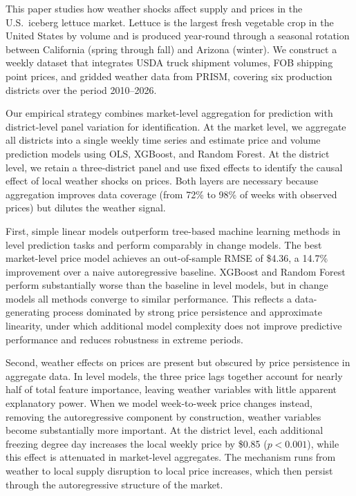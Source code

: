 \documentclass[12pt]{article}
\begin{document}
This paper studies how weather shocks affect supply and prices in the U.S.\ iceberg lettuce market. Lettuce is the largest fresh vegetable crop in the United States by volume and is produced year-round through a seasonal rotation between California (spring through fall) and Arizona (winter). We construct a weekly dataset that integrates USDA truck shipment volumes, FOB shipping point prices, and gridded weather data from PRISM, covering six production districts over the period 2010--2026.

Our empirical strategy combines market-level aggregation for prediction with district-level panel variation for identification. At the market level, we aggregate all districts into a single weekly time series and estimate price and volume prediction models using OLS, XGBoost, and Random Forest. At the district level, we retain a three-district panel and use fixed effects to identify the causal effect of local weather shocks on prices. Both layers are necessary because aggregation improves data coverage (from 72\% to 98\% of weeks with observed prices) but dilutes the weather signal.

First, simple linear models outperform tree-based machine learning methods in level prediction tasks and perform comparably in change models. The best market-level price model achieves an out-of-sample RMSE of \$4.36, a 14.7\% improvement over a naive autoregressive baseline. XGBoost and Random Forest perform substantially worse than the baseline in level models, but in change models all methods converge to similar performance. This reflects a data-generating process dominated by strong price persistence and approximate linearity, under which additional model complexity does not improve predictive performance and reduces robustness in extreme periods.

Second, weather effects on prices are present but obscured by price persistence in aggregate data. In level models, the three price lags together account for nearly half of total feature importance, leaving weather variables with little apparent explanatory power. When we model week-to-week price changes instead, removing the autoregressive component by construction, weather variables become substantially more important. At the district level, each additional freezing degree day increases the local weekly price by \$0.85 ($p < 0.001$), while this effect is attenuated in market-level aggregates. The mechanism runs from weather to local supply disruption to local price increases, which then persist through the autoregressive structure of the market.
\end{document}
